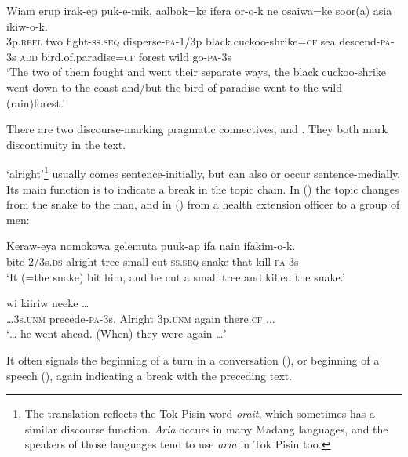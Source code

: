 \ea%
\label{ex:x1361}
\gll Wiam erup irak-ep puk-e-mik, aalbok=ke ifera or-o-k ne osaiwa=ke soor(a) asia ikiw-o-k.\\
3p.\textsc{refl} two fight-\textsc{ss}.\textsc{seq} disperse-\textsc{pa}-1/3p black.cuckoo-shrike=\textsc{cf} sea descend-\textsc{pa}-3s \textsc{add} bird.of.paradise=\textsc{cf} forest wild go-\textsc{pa}-3s\\
\glt`The two of them fought and went their separate ways, the black cuckoo-shrike went down to the coast and/but the bird of paradise went to the wild (rain)forest.'
\z

There are two discourse-marking pragmatic connectives,  and . They both mark discontinuity in the text.

 `alright'\footnote{The translation reflects the Tok Pisin word \textit{orait}, which sometimes has a similar discourse function. \textit{Aria} occurs in many Madang languages, and the speakers of those languages tend to use \textit{aria} in Tok Pisin too.} usually comes sentence-initially, but can also or occur sentence-medially. Its main function is to indicate a break in the topic chain. In () the topic changes from the snake to the man, and in () from a health extension officer to a group of men:

\ea%
\label{ex:x717}
\gll Keraw-eya  nomokowa gelemuta puuk-ap ifa nain ifakim-o-k.\\
bite-2/3s.\textsc{ds} alright tree small cut-\textsc{ss}.\textsc{seq} snake that kill-\textsc{pa}-3s\\
\glt`It (=the snake) bit him, and he cut a small tree and killed the snake.'
\z

\ea%
\label{ex:x718}
  wi kiiriw neeke {\dots} \\
{\dots}3s.\textsc{unm} precede-\textsc{pa}-3s. Alright 3p.\textsc{unm} again there.\textsc{cf} ...\\
\glt`{\dots} he went ahead. (When) they were  again {\dots}'
\z

It often signals the beginning of a turn in a conversation (), or beginning of a speech (), again indicating a break with the preceding text. 

